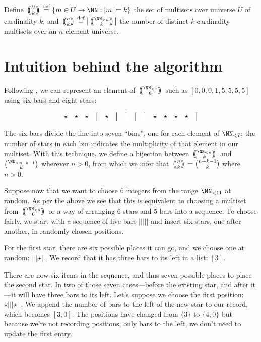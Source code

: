 \documentclass[letterpaper,luatex,11pt]{article}
\newcommand{\multichoose}[2]{
\left.\mathchoice
  {\left(\kern-0.48em\binom{#1}{#2}\kern-0.48em\right)}
  {\big(\kern-0.30em\binom{\smash{#1}}{\smash{#2}}\kern-0.30em\big)}
  {\left(\kern-0.30em\binom{\smash{#1}}{\smash{#2}}\kern-0.30em\right)}
  {\left(\kern-0.30em\binom{\smash{#1}}{\smash{#2}}\kern-0.30em\right)}
\right.}
\newcommand*{\defeq}{\stackrel{\text{def}}{=}}
\begin{document}
Define $\multichoose{U}{k} \defeq \{m \in U \rightarrow \NN: |m| =
k\}$ the set of multisets over universe \(U\) of cardinality \(k\),
and \(\multichoose{n}{k} \defeq
\left|\multichoose{\NN_{<n}}{k}\right|\) the number of distinct
\(k\)-cardinality multisets over an \(n\)-element universe.

\section{Intuition behind the algorithm}

Following \cite{feller}, we can represent an element of
\(\multichoose{\NN_{<7}}{8}\) such as \([0,0,0,1,5,5,5,5]\) using six
bars and eight stars:

\begin{displaymath}
    \begin{array}{ c c c c c c c c c c c c c c c }
        \star & \star & \star & \big| & \star & \big| & \big| & \big| & \big| & \star & \star & \star & \star & \big| \\
    \end{array}
\end{displaymath}

The six bars divide the line into seven ``bins'', one for each element
of \(\NN_{<7}\); the number of stars in each bin indicates the
multiplicity of that element in our multiset. With this technique, we
define a bijection between \(\multichoose{\NN_{<n}}{k}\) and
\(\binom{\NN_{<n + k - 1}}{k}\) wherever \(n > 0\), from which we
infer that \(\multichoose{n}{k} = \binom{n + k - 1}{k}\) where \(n >
0\).

Suppose now that we want to choose 6 integers from the range
$\NN_{<11}$ at random. As per the above we see that this is equivalent
to choosing a multiset from \(\multichoose{\NN_{<6}}{6}\) or a way of
arranging 6 stars and 5 bars into a sequence. To choose fairly, we
start with a sequence of five bars \(|||||\) and insert six stars, one
after another, in randomly chosen positions.

For the first star, there are six possible places it can go, and we
choose one at random: \(|||\star||\). We record that it has three bars
to its left in a list: \([3]\).

There are now six items in the sequence, and thus seven possible
places to place the second star. In two of those seven cases---before
the existing star, and after it---it will have three bars to its left.
Let's suppose we choose the first position: \(\star|||\star||\). We
append the number of bars to the left of the new star to our record,
which becomes \([3, 0]\). The positions have changed from \(\{3\}\) to
\(\{4, 0\}\) but because we're not recording positions, only bars to
the left, we don't need to update the first entry.
\end{document}
